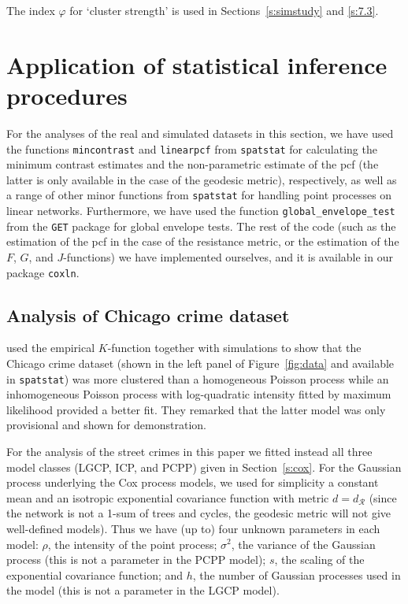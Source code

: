 \documentclass[alpha-refs]{wiley-article}
\begin{document}
The index $\varphi$ for `cluster strength' is used in Sections~\ref{s:simstudy} and \ref{s:7.3}. 


\section{Application of statistical inference procedures}\label{s:appl}

For the analyses of the real and simulated datasets in this section, we have used the functions \texttt{mincontrast} and \texttt{linearpcf} from \texttt{spatstat} for calculating the minimum contrast estimates and the non-parametric estimate of the pcf (the latter is only available in the case of the geodesic metric), respectively, as well as a range of other minor functions from \texttt{spatstat} for handling point processes on linear networks. Furthermore, we have used the function \texttt{global\_envelope\_test} from the \texttt{GET} package for global envelope tests. The rest of the code (such as the estimation of the pcf in the case of the resistance metric, or the estimation of the $F$, $G$, and $J$-functions) we have implemented ourselves, and it is available in our package \texttt{coxln}. 

\subsection{Analysis of Chicago crime dataset}

\cite{AngEtAl} used the empirical $K$-function together with simulations to show that the Chicago crime dataset (shown in the left panel of Figure~\ref{fig:data} and available in \texttt{spatstat}) was more clustered than a homogeneous Poisson process while an inhomogeneous Poisson process with log-quadratic intensity fitted by maximum likelihood provided a better fit. They remarked that the latter model was only provisional and  shown for demonstration. 

For the analysis of the street crimes in this paper we fitted instead all three model classes (LGCP, ICP, and PCPP) given in Section~\ref{s:cox}. %
For the Gaussian process underlying the Cox process models, we used for simplicity a constant mean and an isotropic exponential covariance function with metric $d=d_{\mathcal R}$ 
(since the network is not a 1-sum of trees and cycles, the geodesic metric will not give well-defined models). Thus we have (up to) four unknown parameters in each model: $\rho$, the intensity of the point process; $\sigma^2$, the variance of the Gaussian process (this is not  a parameter in the PCPP model); $s$, the scaling of the exponential covariance function; and $h$, the number of Gaussian processes used in the model (this is not  a parameter in the LGCP model). 
\end{document}
